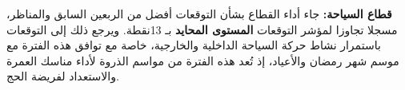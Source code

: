 \textbf{قطاع السياحة:} جاء أداء القطاع بشأن التوقعات أفضل من الربعين السابق والمناظر، مسجلا تجاوزا لمؤشر التوقعات \textbf{المستوى المحايد} بـ 13نقطة. ويرجع ذلك إلى التوقعات باستمرار نشاط حركة السياحة الداخلية والخارجية، خاصة مع توافق هذه الفترة مع موسم شهر رمضان والأعياد، إذ تُعد هذه الفترة من مواسم الذروة لأداء مناسك العمرة والاستعداد لفريضة الحج.
